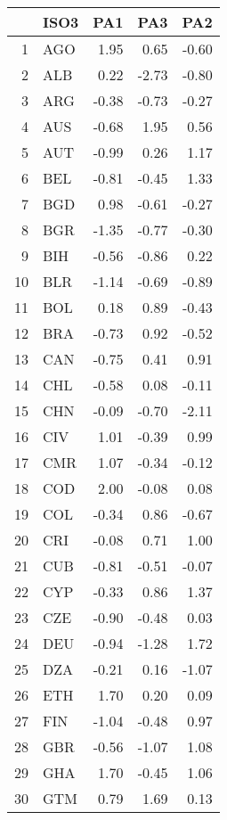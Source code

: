 \begin{table}[ht]
\centering
\begin{tabular}{rlrrr}
  \hline
 & ISO3 & PA1 & PA3 & PA2 \\ 
  \hline
1 & AGO & 1.95 & 0.65 & -0.60 \\ 
  2 & ALB & 0.22 & -2.73 & -0.80 \\ 
  3 & ARG & -0.38 & -0.73 & -0.27 \\ 
  4 & AUS & -0.68 & 1.95 & 0.56 \\ 
  5 & AUT & -0.99 & 0.26 & 1.17 \\ 
  6 & BEL & -0.81 & -0.45 & 1.33 \\ 
  7 & BGD & 0.98 & -0.61 & -0.27 \\ 
  8 & BGR & -1.35 & -0.77 & -0.30 \\ 
  9 & BIH & -0.56 & -0.86 & 0.22 \\ 
  10 & BLR & -1.14 & -0.69 & -0.89 \\ 
  11 & BOL & 0.18 & 0.89 & -0.43 \\ 
  12 & BRA & -0.73 & 0.92 & -0.52 \\ 
  13 & CAN & -0.75 & 0.41 & 0.91 \\ 
  14 & CHL & -0.58 & 0.08 & -0.11 \\ 
  15 & CHN & -0.09 & -0.70 & -2.11 \\ 
  16 & CIV & 1.01 & -0.39 & 0.99 \\ 
  17 & CMR & 1.07 & -0.34 & -0.12 \\ 
  18 & COD & 2.00 & -0.08 & 0.08 \\ 
  19 & COL & -0.34 & 0.86 & -0.67 \\ 
  20 & CRI & -0.08 & 0.71 & 1.00 \\ 
  21 & CUB & -0.81 & -0.51 & -0.07 \\ 
  22 & CYP & -0.33 & 0.86 & 1.37 \\ 
  23 & CZE & -0.90 & -0.48 & 0.03 \\ 
  24 & DEU & -0.94 & -1.28 & 1.72 \\ 
  25 & DZA & -0.21 & 0.16 & -1.07 \\ 
  26 & ETH & 1.70 & 0.20 & 0.09 \\ 
  27 & FIN & -1.04 & -0.48 & 0.97 \\ 
  28 & GBR & -0.56 & -1.07 & 1.08 \\ 
  29 & GHA & 1.70 & -0.45 & 1.06 \\ 
  30 & GTM & 0.79 & 1.69 & 0.13 \\ 

\end{tabular}
\end{table}
